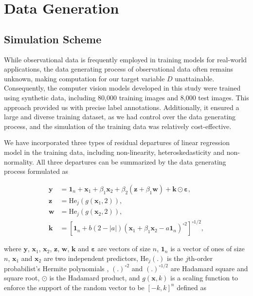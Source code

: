 \documentclass[]{interact}
\theoremstyle{plain}%
\theoremstyle{definition}
\theoremstyle{remark}
\begin{document}
\section{Data Generation}\label{sec-model-data-generation}

\subsection{Simulation Scheme}\label{simulation-scheme}

While observational data is frequently employed in training models for
real-world applications, the data generating process of observational
data often remains unknown, making computation for our target variable
\(D\) unattainable. Consequently, the computer vision models developed
in this study were trained using synthetic data, including 80,000
training images and 8,000 test images. This approach provided us with
precise label annotations. Additionally, it ensured a large and diverse
training dataset, as we had control over the data generating process,
and the simulation of the training data was relatively cost-effective.

We have incorporated three types of residual departures of linear
regression model in the training data, including non-linearity,
heteroskedasticity and non-normality. All three departures can be
summarized by the data generating process formulated as

\begin{align} \label{eq:data-sim}
\boldsymbol{y} &= \boldsymbol{1}_n + \boldsymbol{x}_1 + \beta_1\boldsymbol{x}_2 + \beta_2(\boldsymbol{z} + \beta_1\boldsymbol{w}) + \boldsymbol{k} \odot \boldsymbol{\varepsilon}, \\
\boldsymbol{z} &= \text{He}_j(g(\boldsymbol{x}_1, 2)), \\
\boldsymbol{w} &= \text{He}_j(g(\boldsymbol{x}_2, 2)), \\
\boldsymbol{k} &= \left[\boldsymbol{1}_n + b(2 - |a|)(\boldsymbol{x}_1 + \beta_1\boldsymbol{x}_2 - a\boldsymbol{1}_n)^{\circ2}\right]^{\circ1/2},
\end{align}

\noindent where \(\boldsymbol{y}\), \(\boldsymbol{x}_1\),
\(\boldsymbol{x}_2\), \(\boldsymbol{z}\), \(\boldsymbol{w}\),
\(\boldsymbol{k}\) and \(\boldsymbol{\varepsilon}\) are vectors of size
\(n\), \(\boldsymbol{1}_n\) is a vector of ones of size \(n\),
\(\boldsymbol{x}_1\) and \(\boldsymbol{x}_2\) are two independent
predictors, \(\text{He}_j(.)\) is the \(j\)th-order probabilist's
Hermite polynomials \citep{hermite1864nouveau}, \((.)^{\circ2}\) and
\((.)^{\circ1/2}\) are Hadamard square and square root, \(\odot\) is the
Hadamard product, and \(g(\boldsymbol{x}, k)\) is a scaling function to
enforce the support of the random vector to be \([-k, k]^n\) defined as
\end{document}
